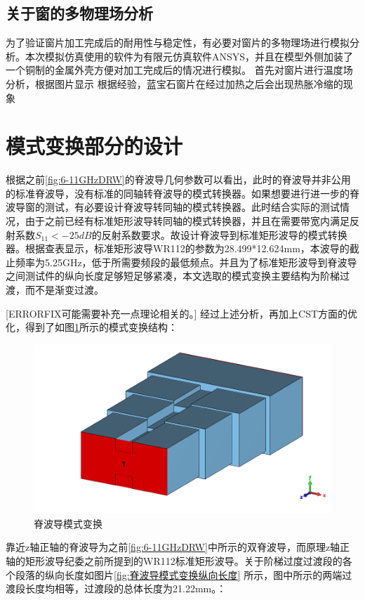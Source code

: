 \documentclass[master]{thesis-uestc}
\begin{document}
\subsection{关于窗的多物理场分析}
为了验证窗片加工完成后的耐用性与稳定性，有必要对窗片的多物理场进行模拟分析。本次模拟仿真使用的软件为有限元仿真软件ANSYS，并且在模型外侧加装了一个铜制的金属外壳方便对加工完成后的情况进行模拟。
首先对窗片进行温度场分析，根据图片显示
根据经验，蓝宝石窗片在经过加热之后会出现热胀冷缩的现象
\section{模式变换部分的设计}
根据之前\ref{fig:6-11GHzDRW}的脊波导几何参数可以看出，此时的脊波导并非公用的标准脊波导，没有标准的同轴转脊波导的模式转换器。如果想要进行进一步的脊波导窗的测试，有必要设计脊波导转同轴的模式转换器。此时结合实际的测试情况，由于之前已经有标准矩形波导转同轴的模式转换器，并且在需要带宽内满足反射系数$S_{11}<-25dB$的反射系数要求。故设计脊波导到标准矩形波导的模式转换器。根据查表显示，标准矩形波导WR112的参数为28.499*12.624mm，本波导的截止频率为5.25GHz，低于所需要频段的最低频点。并且为了标准矩形波导到脊波导之间测试件的纵向长度足够短足够紧凑，本文选取的模式变换主要结构为阶梯过渡，而不是渐变过渡。

[ERRORFIX可能需要补充一点理论相关的。]
经过上述分析，再加上CST方面的优化，得到了如图\ref{fig:脊波导模式变换}所示的模式变换结构：
\begin{figure}[!htb]
    \centering
    \includegraphics[width=0.5\linewidth]{pic/chapter3/脊波导模式变换.png}
    \caption{脊波导模式变换}
    \label{fig:脊波导模式变换}
\end{figure}
靠近z轴正轴的脊波导为之前\ref{fig:6-11GHzDRW}中所示的双脊波导，而原理z轴正轴的矩形波导纪委之前所提到的WR112标准矩形波导。关于阶梯过度过渡段的各个段落的纵向长度如图片\ref{fig:脊波导模式变换纵向长度} 所示，图中所示的两端过渡段长度均相等，过渡段的总体长度为21.22mm。：
\end{document}
